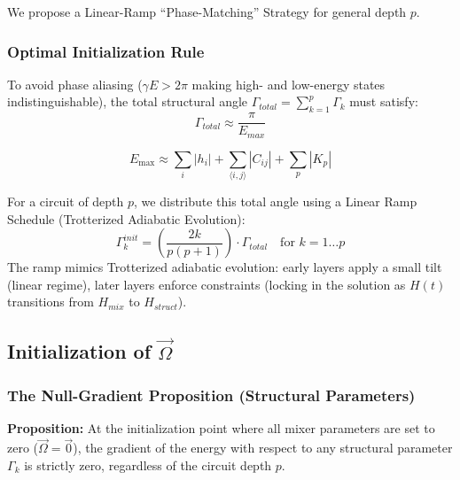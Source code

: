 \documentclass[12pt, a4paper, oneside]{report}
\begin{document}
We propose a Linear-Ramp ``Phase-Matching'' Strategy for general depth $p$.

\subsubsection{Optimal Initialization Rule}
To avoid phase aliasing ($\gamma E > 2\pi$ making high- and low-energy states indistinguishable), the total structural angle $\Gamma_{total} = \sum_{k=1}^p \Gamma_k$ must satisfy:
\begin{equation}
    \Gamma_{total} \approx \frac{\pi}{E_{max}}
\end{equation}

\begin{equation}
    E_{\max} \approx \sum_i |h_i| + \sum_{\langle i,j \rangle} |C_{ij}| + \sum_p |K_p|
\end{equation}

For a circuit of depth $p$, we distribute this total angle using a Linear Ramp Schedule (Trotterized Adiabatic Evolution):
\begin{equation}
    \Gamma_k^{init} = \left( \frac{2k}{p(p+1)} \right) \cdot \Gamma_{total} \quad \text{for } k=1 \dots p
\end{equation}
The ramp mimics Trotterized adiabatic evolution: early layers apply a small tilt (linear regime), later layers enforce constraints (locking in the solution as $H(t)$ transitions from $H_{mix}$ to $H_{struct}$).

\subsection{Initialization of $\vec{\Omega}$}

\subsubsection{The Null-Gradient Proposition (Structural Parameters)}
\label{sec:null-gradient}

\textbf{Proposition:} At the initialization point where all mixer parameters are set to zero ($\vec{\Omega} = \vec{0}$), the gradient of the energy with respect to any structural parameter $\Gamma_k$ is strictly zero, regardless of the circuit depth $p$.
\end{document}
